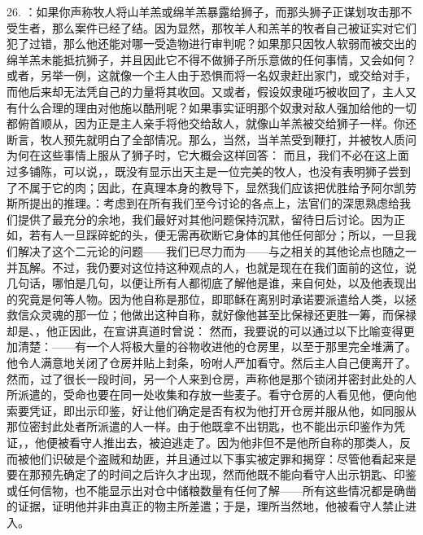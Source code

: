 26. ：如果你声称牧人将山羊羔或绵羊羔暴露给狮子，而那头狮子正谋划攻击那不受生者，那么案件已经了结。因为显然，那牧羊人和羔羊的牧者自己被证实对它们犯了过错，那么他还能对哪一受造物进行审判呢？如果那只因牧人软弱而被交出的绵羊羔未能抵抗狮子，并且因此它不得不做狮子所乐意做的任何事情，又会如何？或者，另举一例，这就像一个主人由于恐惧而将一名奴隶赶出家门，或交给对手，而他后来却无法凭自己的力量将其收回。又或者，假设奴隶碰巧被收回了，主人又有什么合理的理由对他施以酷刑呢？如果事实证明那个奴隶对敌人强加给他的一切都俯首顺从，因为正是主人亲手将他交给敌人，就像山羊羔被交给狮子一样。你还断言，牧人预先就明白了全部情况。那么，当然，当羊羔受到鞭打，并被牧人质问为何在这些事情上服从了狮子时，它大概会这样回答： 而且，我们不必在这上面过多铺陈，可以说，，既没有显示出天主是一位完美的牧人，也没有表明狮子尝到了不属于它的肉；因此，在真理本身的教导下，显然我们应该把优胜给予阿尔凯劳斯所提出的推理。：考虑到在所有我们至今讨论的各点上，法官们的深思熟虑给我们提供了最充分的余地，我们最好对其他问题保持沉默，留待日后讨论。因为正如，若有人一旦踩碎蛇的头，便无需再砍断它身体的其他任何部分；所以，一旦我们解决了这个二元论的问题——我们已尽力而为——与之相关的其他论点也随之一并瓦解。不过，我仍要对这位持这种观点的人，也就是现在在我们面前的这位，说几句话，哪怕是几句，以便让所有人都彻底了解他是谁，来自何处，以及他表现出的究竟是何等人物。因为他自称是那位，即耶稣在离别时承诺要派遣给人类，以拯救信众灵魂的那一位；他做出这种自称，就好像他甚至比保禄还更胜一筹，而保禄却是、，他正因此，在宣讲真道时曾说： 然而，我要说的可以通过以下比喻变得更加清楚：——有一个人将极大量的谷物收进他的仓房里，以至于那里完全堆满了。他令人满意地关闭了仓房并贴上封条，吩咐人严加看守。然后主人自己便离开了。然而，过了很长一段时间，另一个人来到仓房，声称他是那个锁闭并密封此处的人所派遣的，受命也要在同一处收集和存放一些麦子。看守仓房的人看见他，便向他索要凭证，即出示印鉴，好让他们确定是否有权为他打开仓房并服从他，如同服从那位密封此处者所派遣的人一样。由于他既拿不出钥匙，也不能出示印鉴作为凭证，，他便被看守人推出去，被迫逃走了。因为他非但不是他所自称的那类人，反而被他们识破是个盗贼和劫匪，并且通过以下事实被定罪和揭穿：尽管他看起来是要在那预先确定了的时间之后许久才出现，然而他既不能向看守人出示钥匙、印鉴或任何信物，也不能显示出对仓中储粮数量有任何了解——所有这些情况都是确凿的证据，证明他并非由真正的物主所差遣；于是，理所当然地，他被看守人禁止进入。\par

